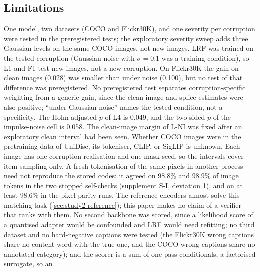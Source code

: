 \subsection{Limitations}\label{sec:limitations}
One model, two datasets (COCO and Flickr30K), and one severity per corruption were tested in the preregistered tests; the exploratory severity sweep adds three Gaussian levels on the same COCO images, not new images.
LRF was trained on the tested corruption (Gaussian noise with $\sigma=0.1$ was a training condition), so L1 and F1 test new images, not a new
corruption.
On Flickr30K the gain on clean images (0.028) was smaller than under noise (0.100), but no test of that difference was preregistered.
No preregistered test separates corruption-specific weighting from a generic gain, since the clean-image and splice estimates were also
positive; ``under Gaussian noise'' names the tested condition, not a specificity.
The Holm-adjusted $p$ of L4 is 0.049, and the two-sided $p$ of the impulse-noise cell is 0.058.
The clean-image margin of L-NI was fixed after an exploratory clean interval had been seen.
Whether COCO images were in the pretraining data of UniDisc, its tokeniser, CLIP, or SigLIP is unknown.
Each image has one corruption realisation and one mask seed, so the intervals cover item sampling only.
A fresh tokenisation of the same pixels in another process need not reproduce the stored codes: it agreed on 98.8\% and 98.9\% of
image tokens in the two stopped self-checks (supplement S-I, deviation 1), and on at least 98.6\% in the pixel-parity runs.
The reference encoders almost solve this matching task (\cref{sec:study2-reference}); this paper makes no claim of a verifier that ranks
with them.
No second backbone was scored, since a likelihood score of a quantised adapter would be confounded and LRF would need refitting; no third
dataset and no hard-negative captions were tested (the Flickr30K wrong captions share no content word with the true one, and the COCO wrong captions share no annotated category); and the scorer is a sum of one-pass conditionals, a factorised surrogate, so an
